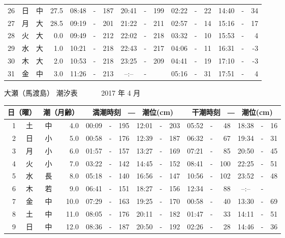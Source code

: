 \documentclass[12pt.a4j]{jsarticle}
\begin{document}
\begin{center}
\begin{table}[ht]
\begin{tabular}{|rc|cr|ccrccr|ccrccr|}
26 & 日 & 中 & 27.5 &  08:48 &-& 187  &  20:41 &-& 199  &   02:22 &-&  22  &   14:40 &-&  34  \\
27 & 月 & 大 & 28.5 &  09:19 &-& 201  &  21:22 &-& 211  &   02:57 &-&  14  &   15:16 &-&  17  \\
28 & 火 & 大 &  0.0 &  09:49 &-& 212  &  22:02 &-& 218  &   03:32 &-&  10  &   15:53 &-&   4  \\
29 & 水 & 大 &  1.0 &  10:21 &-& 218  &  22:43 &-& 217  &   04:06 &-&  11  &   16:31 &-&  -3  \\
30 & 木 & 大 &  2.0 &  10:53 &-& 218  &  23:25 &-& 209  &   04:41 &-&  19  &   17:10 &-&  -3  \\
31 & 金 & 中 &  3.0 &  11:26 &-& 213  &  --:-- &-&     &   05:16 &-&  31  &   17:51 &-&   4  \\
   \hline
   \end{tabular}
\end{table}
\newpage
 {\LARGE 大瀬（馬渡島）  潮汐表　　　}
 {\large 2017 年  4 月}\\
 \begin{table}[ht]
    \begin{tabular}{|rc|cr|ccrccr|ccrccr|}
    \hline
    \multicolumn{2}{|c|}{日（曜）} & \multicolumn{2}{c|}{潮（月齢）} & \multicolumn{6}{c|}{満潮時刻　―　潮位(cm)} & \multicolumn{6}{c|}{干潮時刻　―　潮位(cm)} \\
 \hline
 1 & 土 & 中 &  4.0 &  00:09 &-& 195  &  12:01 &-& 203  &   05:52 &-&  48  &   18:38 &-&  16  \\
 2 & 日 & 小 &  5.0 &  00:58 &-& 176  &  12:39 &-& 187  &   06:32 &-&  67  &   19:34 &-&  31  \\
 3 & 月 & 小 &  6.0 &  01:57 &-& 157  &  13:27 &-& 169  &   07:21 &-&  85  &   20:50 &-&  45  \\
 4 & 火 & 小 &  7.0 &  03:22 &-& 142  &  14:45 &-& 152  &   08:41 &-& 100  &   22:25 &-&  51  \\
 5 & 水 & 長 &  8.0 &  05:18 &-& 140  &  16:56 &-& 147  &   10:56 &-& 102  &   23:52 &-&  48  \\
 6 & 木 & 若 &  9.0 &  06:41 &-& 151  &  18:27 &-& 156  &   12:34 &-&  88  &   --:-- &-&     \\
 7 & 金 & 中 & 10.0 &  07:29 &-& 163  &  19:25 &-& 170  &   00:58 &-&  40  &   13:30 &-&  69  \\
 8 & 土 & 中 & 11.0 &  08:05 &-& 176  &  20:11 &-& 182  &   01:47 &-&  33  &   14:11 &-&  51  \\
 9 & 日 & 中 & 12.0 &  08:36 &-& 187  &  20:50 &-& 192  &   02:26 &-&  28  &   14:46 &-&  36  \\

\end{tabular}
\end{table}
\end{center}
\end{document}
